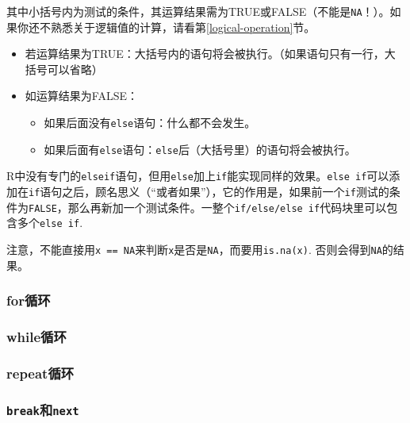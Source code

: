 \documentclass[]{book}
\providecommand{\tightlist}{%
  \setlength{\itemsep}{0pt}\setlength{\parskip}{0pt}}
\begin{document}
其中小括号内为测试的条件，其运算结果需为TRUE或FALSE（不能是\texttt{NA}！）。如果你还不熟悉关于逻辑值的计算，请看第\ref{logical-operation}节。

\begin{itemize}
\item
  若运算结果为TRUE：大括号内的语句将会被执行。（如果语句只有一行，大括号可以省略）
\item
  如运算结果为FALSE：

  \begin{itemize}
  \tightlist
  \item
    如果后面没有\texttt{else}语句：什么都不会发生。
  \item
    如果后面有\texttt{else}语句：\texttt{else}后（大括号里）的语句将会被执行。
  \end{itemize}
\end{itemize}

R中没有专门的\texttt{elseif}语句，但用\texttt{else}加上\texttt{if}能实现同样的效果。\texttt{else\ if}可以添加在\texttt{if}语句之后，顾名思义（``或者如果''），它的作用是，如果前一个\texttt{if}测试的条件为\texttt{FALSE}，那么再新加一个测试条件。一整个\texttt{if/else/else\ if}代码块里可以包含多个\texttt{else\ if}.

注意，不能直接用\texttt{x\ ==\ NA}来判断\texttt{x}是否是\texttt{NA}，而要用\texttt{is.na(x)}. 否则会得到\texttt{NA}的结果。

\hypertarget{control-flow-rigorous-for}{%
\subsubsection{for循环}\label{control-flow-rigorous-for}}

\hypertarget{control-flow-rigorous-while}{%
\subsubsection{while循环}\label{control-flow-rigorous-while}}

\hypertarget{control-flow-rigorous-repeat}{%
\subsubsection{repeat循环}\label{control-flow-rigorous-repeat}}

\hypertarget{control-flow-rigorous-break-next}{%
\subsubsection{\texorpdfstring{\texttt{break}和\texttt{next}}{break和next}}\label{control-flow-rigorous-break-next}}
\end{document}
